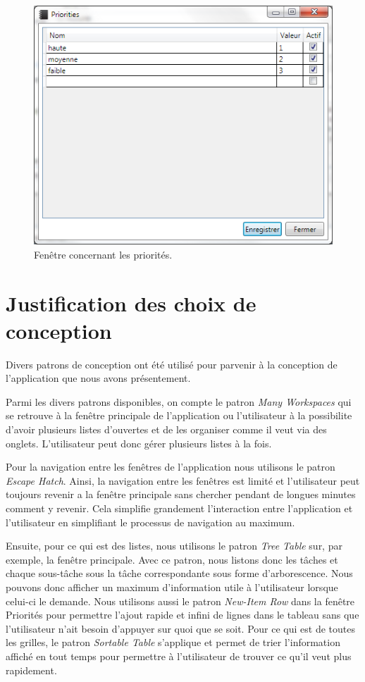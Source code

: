 \documentclass[letterpaper, oneside, 12pt, these, creativecommons]{thETS}
\begin{document}
\begin{figure}[H!]
	\centering
	\includegraphics[width=1\textwidth]{fenetre_priorite.png}
	\caption{Fenêtre concernant les priorités.}
\end{figure}

\newpage

\section{Justification des choix de conception}

Divers patrons de conception ont été utilisé pour parvenir à la conception de l'application que nous avons présentement. 

Parmi les divers patrons disponibles, on compte le patron \emph{Many Workspaces} qui se retrouve à la fenêtre principale de l'application ou l'utilisateur à la possibilite d'avoir plusieurs listes d'ouvertes et de les organiser comme il veut via des onglets. L'utilisateur peut donc gérer plusieurs listes à la fois. 

Pour la navigation entre les fenêtres de l'application nous utilisons le patron \emph{Escape Hatch}. Ainsi, la navigation entre les fenêtres est limité et l'utilisateur peut toujours revenir a la fenêtre principale sans chercher pendant de longues minutes comment y revenir. Cela simplifie grandement l'interaction entre l'application et l'utilisateur en simplifiant le processus de navigation au maximum. 

Ensuite, pour ce qui est des listes, nous utilisons le patron \emph{Tree Table} sur, par exemple, la fenêtre principale. Avec ce patron, nous listons donc les tâches et chaque sous-tâche sous la tâche correspondante sous forme d'arborescence. Nous pouvons donc afficher un maximum d'information utile à l'utilisateur lorsque celui-ci le demande. Nous utilisons aussi le patron \emph{New-Item Row} dans la fenêtre Priorités pour permettre l'ajout rapide et infini de lignes dans le tableau sans que l'utilisateur n'ait besoin d'appuyer sur quoi que se soit. Pour ce qui est de toutes les grilles, le patron \emph{Sortable Table} s'applique et permet de trier l'information affiché en tout temps pour permettre à l'utilisateur de trouver ce qu'il veut plus rapidement. 
\end{document}
